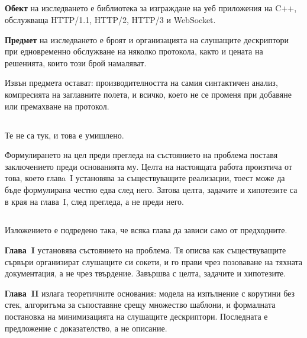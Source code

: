 \subsection*{}

\textbf{Обект} на изследването е библиотека за изграждане на уеб приложения на C++, обслужваща
HTTP/1.1, HTTP/2, HTTP/3 и WebSocket.

\textbf{Предмет} на изследването е броят и организацията на слушащите дескриптори при
едновременно обслужване на няколко протокола, както и цената на решенията, които този брой
намаляват.

Извън предмета остават: производителността на самия синтактичен анализ, компресията на
заглавните полета, и всичко, което не се променя при добавяне или премахване на протокол.

\subsection*{}

Те не са тук, и това е умишлено.

Формулирането на цел преди прегледа на състоянието на проблема поставя заключението преди
основанията му. Целта на настоящата работа произтича от това, което главa~I установява за
съществуващите реализации, тоест може да бъде формулирана честно едва след него. Затова
целта, задачите и хипотезите са в края на глава~I, след прегледа, а не преди него.

\subsection*{}

Изложението е подредено така, че всяка глава да зависи само от предходните.

\textbf{Глава~I} установява състоянието на проблема. Тя описва как съществуващите сървъри
организират слушащите си сокети, и го прави чрез позоваване на тяхната документация, а не
чрез твърдение. Завършва с целта, задачите и хипотезите.

\textbf{Глава~II} излага теоретичните основания: модела на изпълнение с корутини без стек,
алгоритъма за съпоставяне срещу множество шаблони, и формалната постановка на минимизацията
на слушащите дескриптори. Последната е предложение с доказателство, а не описание.

